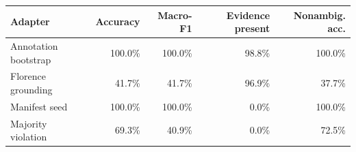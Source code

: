 \begin{tabular}{lrrrr}
\toprule
Adapter & Accuracy & Macro-F1 & Evidence present & Nonambig. acc. \\
\midrule
Annotation bootstrap & 100.0\% & 100.0\% & 98.8\% & 100.0\% \\
Florence grounding & 41.7\% & 41.7\% & 96.9\% & 37.7\% \\
Manifest seed & 100.0\% & 100.0\% & 0.0\% & 100.0\% \\
Majority violation & 69.3\% & 40.9\% & 0.0\% & 72.5\% \\
\bottomrule
\end{tabular}
